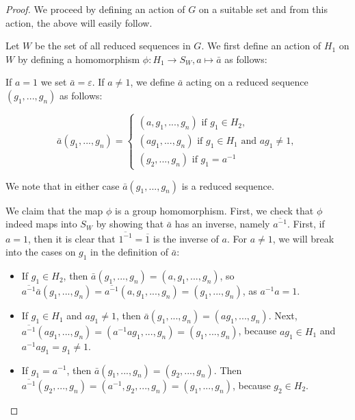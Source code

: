 \documentclass[12pt]{article}
\newcommand{\vs}{\vskip10pt}
\begin{document}
	\begin{proof}
		
		We proceed by defining an action of $G$ on a suitable set and from this action, the above will easily follow. 
		
		\vs 
		
		Let $W$ be the set of all reduced sequences in $G$. We first define an action of $H_1$ on $W$ by defining a homomorphism $\phi: H_1 \rightarrow S_W, a \mapsto \bar{a}$ as follows: 
		
		\vs 
		
		If $a = 1$ we set $\bar{a} = \varepsilon$. If $a \neq 1$, we define $\bar{a}$ acting on a  reduced sequence $(g_1,...,g_n)$ as follows: 
		
		\vs 
		
		\[ \bar{a}(g_1,...,g_n) = \begin{cases} 
		(a, g_1,...,g_n) \text{ if } g_1 \in H_2, \\
		(ag_1,...,g_n) \text{ if } g_1 \in H_1 \text{ and } ag_1 \neq 1, \\
		(g_2,...,g_n) \text{ if } g_1 = a^{-1}
		\end{cases}
		\]
		
		We note that in either case $\bar{a}(g_1,...,g_n) $ is a reduced sequence. 
		
		\vs
		
		We claim that the map $\phi$ is a group homomorphism. First, we check that $\phi$ indeed maps into $S_W$ by showing that $\bar{a}$ has an inverse, namely $\overline{a^{-1}}$. First, if $a = 1$, then it is clear that $\overline{1^{-1}} = \overline{1}$ is the inverse of $a$. For $a \neq 1$, we will break into the cases on $g_1$ in the definition of $\bar{a}$:
		
		\begin{itemize}
			\item If $g_1 \in H_2$, then $\bar{a}(g_1,...,g_n) = (a, g_1,...,g_n)$, so $\overline{a^{-1}} \bar{a} (g_1,...,g_n) = \overline{a^{-1}}(a, g_1,...,g_n) = (g_1,...,g_n)$, as $a^{-1}a=1$. 
			\item If $g_1 \in H_1$ and $ag_1 \neq 1$, then $\bar{a}(g_1,...,g_n) = (ag_1,...,g_n)$. Next, $\overline{a^{-1}}(ag_1,...,g_n) = (a^{-1}ag_1,...,g_n) = (g_1,...,g_n)$, because $a g_1 \in H_1$ and $a^{-1} a g_1 = g_1 \neq 1$.
			\item If $g_1 = a^{-1}$, then $\bar{a} (g_1,...,g_n) = (g_2,...,g_n)$. Then $\overline{a^{-1}}(g_2,...,g_n) = (a^{-1}, g_2,...,g_n) = (g_1,...,g_n)$, because $g_2 \in H_2$. 
		\end{itemize}
	

\end{proof}
\end{document}
